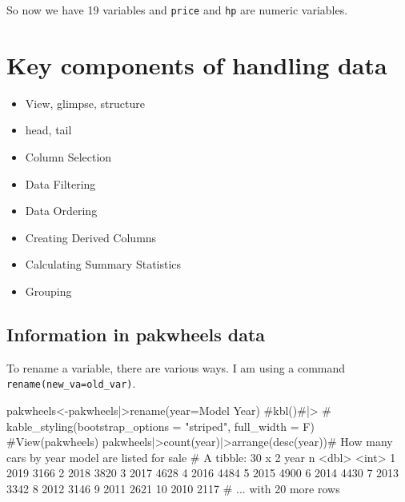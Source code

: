 \documentclass[
  letterpaper,
  DIV=11,
  numbers=noendperiod]{scrartcl}
\newenvironment{Shaded}{\begin{snugshade}}{\end{snugshade}}
\newcommand{\AttributeTok}[1]{\textcolor[rgb]{0.40,0.45,0.13}{#1}}
\newcommand{\CommentTok}[1]{\textcolor[rgb]{0.37,0.37,0.37}{#1}}
\newcommand{\DecValTok}[1]{\textcolor[rgb]{0.68,0.00,0.00}{#1}}
\newcommand{\ErrorTok}[1]{\textcolor[rgb]{0.68,0.00,0.00}{#1}}
\newcommand{\FunctionTok}[1]{\textcolor[rgb]{0.28,0.35,0.67}{#1}}
\newcommand{\NormalTok}[1]{\textcolor[rgb]{0.00,0.23,0.31}{#1}}
\newcommand{\OtherTok}[1]{\textcolor[rgb]{0.00,0.23,0.31}{#1}}
\newcommand{\SpecialCharTok}[1]{\textcolor[rgb]{0.37,0.37,0.37}{#1}}
\newcommand{\StringTok}[1]{\textcolor[rgb]{0.13,0.47,0.30}{#1}}
\providecommand{\tightlist}{%
  \setlength{\itemsep}{0pt}\setlength{\parskip}{0pt}}\usepackage{longtable,booktabs,array}
\begin{document}
So now we have 19 variables and \texttt{price} and \texttt{hp} are
numeric variables.

\hypertarget{key-components-of-handling-data}{%
\section{Key components of handling
data}\label{key-components-of-handling-data}}

\begin{itemize}
\tightlist
\item
  View, glimpse, structure
\item
  head, tail
\item
  Column Selection
\item
  Data Filtering
\item
  Data Ordering
\item
  Creating Derived Columns
\item
  Calculating Summary Statistics
\item
  Grouping
\end{itemize}

\hypertarget{information-in-pakwheels-data}{%
\subsection{\texorpdfstring{Information in \textbf{pakwheels}
data}{Information in pakwheels data}}\label{information-in-pakwheels-data}}

To rename a variable, there are various ways. I am using a command
\texttt{rename(new\_va=old\_var)}.

\begin{Shaded}
\begin{Highlighting}[]
\NormalTok{pakwheels}\OtherTok{\textless{}{-}}\NormalTok{pakwheels}\SpecialCharTok{|\textgreater{}}\FunctionTok{rename}\NormalTok{(}\AttributeTok{year=}\StringTok{\textasciigrave{}}\AttributeTok{Model Year}\StringTok{\textasciigrave{}}\NormalTok{)}
\CommentTok{\#kbl()\#|\textgreater{}}
 \CommentTok{\# kable\_styling(bootstrap\_options = "striped", full\_width = F)}
\CommentTok{\#View(pakwheels)}
\NormalTok{pakwheels}\SpecialCharTok{|\textgreater{}}\FunctionTok{count}\NormalTok{(year)}\SpecialCharTok{|\textgreater{}}\FunctionTok{arrange}\NormalTok{(}\FunctionTok{desc}\NormalTok{(year))}\CommentTok{\# How many cars by year model are listed for sale}
\CommentTok{\# A tibble: 30 x 2}
\NormalTok{    year     n}
   \SpecialCharTok{\textless{}}\NormalTok{dbl}\SpecialCharTok{\textgreater{}} \ErrorTok{\textless{}}\NormalTok{int}\SpecialCharTok{\textgreater{}}
 \DecValTok{1}  \DecValTok{2019}  \DecValTok{3166}
 \DecValTok{2}  \DecValTok{2018}  \DecValTok{3820}
 \DecValTok{3}  \DecValTok{2017}  \DecValTok{4628}
 \DecValTok{4}  \DecValTok{2016}  \DecValTok{4484}
 \DecValTok{5}  \DecValTok{2015}  \DecValTok{4900}
 \DecValTok{6}  \DecValTok{2014}  \DecValTok{4430}
 \DecValTok{7}  \DecValTok{2013}  \DecValTok{3342}
 \DecValTok{8}  \DecValTok{2012}  \DecValTok{3146}
 \DecValTok{9}  \DecValTok{2011}  \DecValTok{2621}
\DecValTok{10}  \DecValTok{2010}  \DecValTok{2117}
\CommentTok{\# ... with 20 more rows}
\end{Highlighting}
\end{Shaded}
\end{document}
